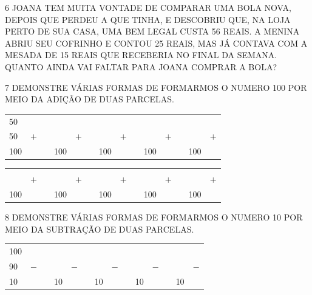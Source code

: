 \num{6} JOANA TEM MUITA VONTADE DE COMPARAR UMA BOLA NOVA, DEPOIS QUE PERDEU A QUE TINHA, E DESCOBRIU QUE, NA LOJA PERTO DE SUA CASA, UMA BEM LEGAL CUSTA 56 REAIS. A MENINA ABRIU SEU COFRINHO E CONTOU 25 REAIS, MAS JÁ CONTAVA COM A MESADA DE 15 REAIS QUE RECEBERIA NO FINAL DA SEMANA. QUANTO AINDA VAI FALTAR PARA JOANA COMPRAR A BOLA?



\num{7} DEMONSTRE VÁRIAS FORMAS DE FORMARMOS O NUMERO 100 POR MEIO DA ADIÇÃO DE
DUAS PARCELAS.

\begin{center}
\begin{tabular}{llllllllllllll}
50 &  &  & \mbox{} &  &  & \mbox{} &  &  & \mbox{} &  &  & \mbox{} &  \\
50 & $+$ &  & \mbox{} & $+$ &  & \mbox{} & $+$ &  & \mbox{} & $+$ &  & \mbox{} & $+$ \\ \cline{1-1} \cline{4-4} \cline{7-7} \cline{10-10} \cline{13-13}
100 &  &  & 100 &  &  & 100 &  &  & 100 &  &  & 100 & 
\end{tabular}
\end{center}

\begin{center}
\begin{tabular}{llllllllllllll}
\mbox{} &  &  & \mbox{} &  &  & \mbox{} &  &  & \mbox{} &  &  & \mbox{} &  \\
\mbox{} & $+$ &  & \mbox{} & $+$ &  & \mbox{} & $+$ &  & \mbox{} & $+$ &  & \mbox{} & $+$ \\ \cline{1-1} \cline{4-4} \cline{7-7} \cline{10-10} \cline{13-13}
100 &  &  & 100 &  &  & 100 &  &  & 100 &  &  & 100 & 
\end{tabular}
\end{center}


\num{8} DEMONSTRE VÁRIAS FORMAS DE FORMARMOS O NUMERO 10 POR MEIO DA SUBTRAÇÃO DE
DUAS PARCELAS.

\begin{center}
\begin{tabular}{llllllllllllll}
100 &  &  & \mbox{} &  &  & \mbox{} &  &  & \mbox{} &  &  & \mbox{} &  \\
90 & $-$ &  & \mbox{} & $-$ &  & \mbox{} & $-$ &  & \mbox{} & $-$ &  & \mbox{} & $-$ \\ \cline{1-1} \cline{4-4} \cline{7-7} \cline{10-10} \cline{13-13}
10 &  &  & 10 &  &  & 10 &  &  & 10 &  &  & 10 & 
\end{tabular}
\end{center}

